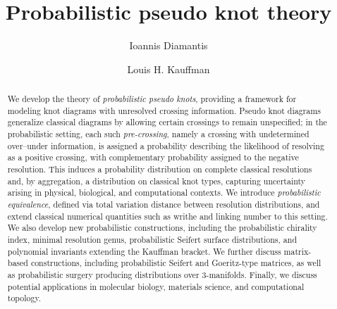 \documentclass[a4paper, reqno, 12pt]{amsart}
\theoremstyle{plain}
\theoremstyle{definition}
\begin{document}
\title[Probabilistic pseudo knot theory]
  {Probabilistic pseudo knot theory}


\author{Ioannis Diamantis}
\address{Department of Data Analytics and Digitalisation,
School of Business and Economics, Maastricht University,
P.O.Box 616, 6200 MD, Maastricht,
The Netherlands.
}

\author{Louis H. Kauffman}
\address{Department of Mathematics, Statistics and Computer Science
University of Illinois at Chicago, 851 South Morgan Street
Chicago, IL, 60607-7045.}
\address{International Institute for Sustainability with Knotted Chiral Meta Matter (WPI-SKCM2),
    Hiroshima University, 1-3-1 Kagamiyama, Higashi-Hiroshima, Hiroshima 739-8526, Japan.}










\setcounter{section}{-1}





\begin{abstract}
We develop the theory of \emph{probabilistic pseudo knots}, providing a framework for modeling knot diagrams with unresolved crossing information. Pseudo knot diagrams generalize classical diagrams by allowing certain crossings to remain unspecified; in the probabilistic setting, each such \emph{pre-crossing}, namely a crossing with undetermined over--under information, is assigned a probability describing the likelihood of resolving as a positive crossing, with complementary probability assigned to the negative resolution. This induces a probability distribution on complete classical resolutions and, by aggregation, a distribution on classical knot types, capturing uncertainty arising in physical, biological, and computational contexts. We introduce \emph{probabilistic equivalence}, defined via total variation distance between resolution distributions, and extend classical numerical quantities such as writhe and linking number to this setting. We also develop new probabilistic constructions, including the probabilistic chirality index, minimal resolution genus, probabilistic Seifert surface distributions, and polynomial invariants extending the Kauffman bracket. We further discuss matrix-based constructions, including probabilistic Seifert and Goeritz-type matrices, as well as probabilistic surgery producing distributions over \(3\)-manifolds. Finally, we discuss potential applications in molecular biology, materials science, and computational topology.
\end{abstract}
\end{document}
